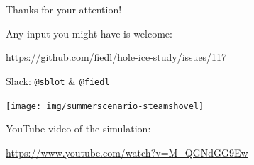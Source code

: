 \section{}
\begin{frame}[fragile]{Thanks for your attention!}
  \begin{center}
  Any input you might have is welcome: \\ \vspace{0.3cm}

  \url{https://github.com/fiedl/hole-ice-study/issues/117} \\ \vspace{0.1cm}

  Slack:
  \href{https://icecube-spno.slack.com/messages/U0BJE7Z7T}{\texttt{@sblot}}
  \&
  \href{https://icecube-spno.slack.com/messages/@U092MBFU2}{\texttt{@fiedl}}

  \vspace{1.5cm}

  \texttt{[image: img/summerscenario-steamshovel]}

  YouTube video of the simulation:

  \url{https://www.youtube.com/watch?v=M_QGNdGG9Ew}

  \end{center}
\end{frame}